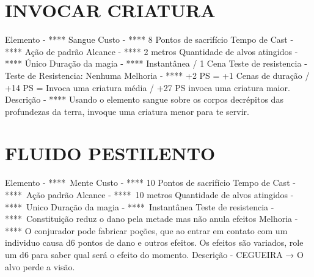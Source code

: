 \documentclass{article}%
\begin{document}
\section{INVOCAR CRIATURA}%
\label{sec:INVOCARCRIATURA}%
Elemento {-} **** Sangue\newline%
Custo {-} **** 8 Pontos de sacrifício\newline%
Tempo de Cast {-} **** Ação de padrão\newline%
Alcance {-} **** 2 metros\newline%
Quantidade de alvos atingidos {-} **** Único\newline%
Duração da magia {-} **** Instantânea / 1 Cena\newline%
Teste de resistencia {-} Teste de Resistencia: Nenhuma\newline%
Melhoria {-} **** +2 PS = +1 Cenas de duração / +14 PS = Invoca uma criatura média / +27 PS invoca uma criatura maior.\newline%
Descrição {-} **** Usando o elemento sangue sobre os corpos decrépitos das profundezas da terra, invoque uma criatura menor para te servir.\newline%

%
\section{FLUIDO PESTILENTO}%
\label{sec:FLUIDOPESTILENTO}%
Elemento {-} ****~Mente\newline%
Custo {-} **** 10 Pontos de sacrifício\newline%
Tempo de Cast {-} ****~Ação padrão\newline%
Alcance {-} ****~10 metros\newline%
Quantidade de alvos atingidos {-} ****~Unico\newline%
Duração da magia {-} ****~Instantânea\newline%
Teste de resistencia {-} ****~Constituição reduz o dano pela metade mas não anula efeitos\newline%
Melhoria {-} **** O conjurador pode fabricar poções, que ao entrar em contato com um individuo causa d6 pontos de dano e outros efeitos. Os efeitos são variados, role um d6 para saber qual será o efeito do momento.\newline%
Descrição {-} CEGUEIRA → O alvo perde a visão.\newline%

%
\end{document}
